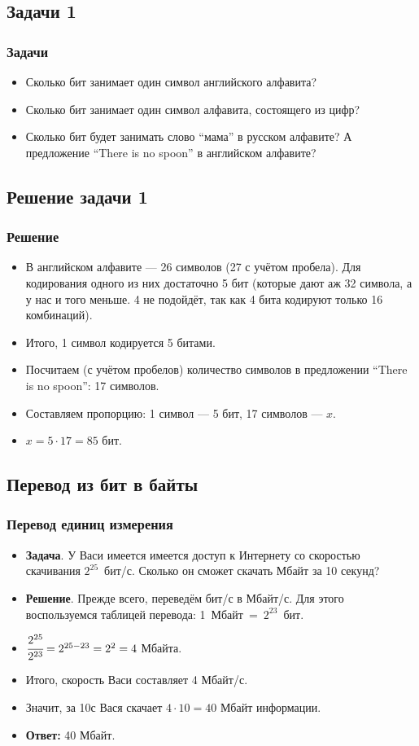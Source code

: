 \documentclass[compress,red]{beamer}
\begin{document}
\subsection{Задачи 1}
\begin{frame}[fragile]
  \frametitle{Задачи}
  \begin{itemize}
    \item Сколько бит занимает один символ английского алфавита?
    \item Сколько бит занимает один символ алфавита, состоящего из цифр?
    \item Сколько бит будет занимать слово ``мама'' в русском алфавите? А предложение ``There is no spoon'' в английском алфавите?
  \end{itemize}
\end{frame}

\subsection{Решение задачи 1}
\begin{frame}[fragile]
  \frametitle{Решение}
  \begin{itemize}
    \item В английском алфавите --- 26 символов (27 с учётом пробела). Для кодирования одного из них достаточно 5 бит (которые дают аж 32 символа, а у нас и того меньше. 4 не подойдёт, так как 4 бита кодируют только 16 комбинаций).
    \item Итого, 1 символ кодируется 5 битами.
    \item Посчитаем (с учётом пробелов) количество символов в предложении ``There is no spoon'': 17 символов.
    \item Составляем пропорцию: 1 символ --- 5 бит, 17 символов --- $x$.
    \item $x = 5\cdot 17 = 85$ бит.
  \end{itemize}
\end{frame}

\subsection{Перевод из бит в байты}
\begin{frame}[fragile]
  \frametitle{Перевод единиц измерения}
  \begin{itemize}
    \item \textbf{Задача}. У Васи имеется имеется доступ к Интернету со скоростью скачивания $2^{25}$~бит/с. Сколько он сможет скачать Мбайт за 10 секунд?
    \item \textbf{Решение}. Прежде всего, переведём бит/с в Мбайт/с. Для этого воспользуемся таблицей перевода: 1~Мбайт~=~$2^{23}$~бит.
    \item $\cfrac{2^{25}}{2^{23}} = 2^{25-23} = 2^2 = 4$ Мбайта.
    \item Итого, скорость Васи составляет 4 Мбайт/с.
    \item Значит, за 10с Вася скачает $4\cdot 10 = 40$ Мбайт информации.
    \item \textbf{Ответ:} 40 Мбайт.
  \end{itemize}
\end{frame}
\end{document}
